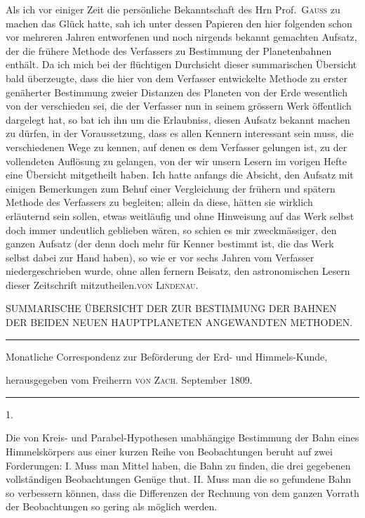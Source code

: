\expandafter\def\csname HistoricalNoteText8\endcsname{Als ich vor einiger Zeit die persönliche Bekanntschaft des Hrn Prof.\ \textsc{Gauss} zu machen das Glück hatte, sah ich unter dessen Papieren den hier folgenden schon vor mehreren Jahren entworfenen und noch nirgends bekannt gemachten Aufsatz, der die frühere Methode des Verfassers zu Bestimmung der Planetenbahnen enthält. Da ich mich bei der flüchtigen Durchsicht dieser summarischen Übersicht bald überzeugte, dass die hier von dem Verfasser entwickelte Methode zu erster genäherter Bestimmung zweier Distanzen des Planeten von der Erde wesentlich von der verschieden sei, die der Verfasser nun in seinem grössern Werk öffentlich dargelegt hat, so bat ich ihn um die Erlaubniss, diesen Aufsatz bekannt machen zu dürfen, in der Voraussetzung, dass es allen Kennern interessant sein muss, die verschiedenen Wege zu kennen, auf denen es dem Verfasser gelungen ist, zu der vollendeten Auflösung zu gelangen, von der wir unsern Lesern im vorigen Hefte eine Übersicht mitgetheilt haben. Ich hatte anfangs die Absicht, den Aufsatz mit einigen Bemerkungen zum Behuf einer Vergleichung der frühern und spätern Methode des Verfassers zu begleiten; allein da diese, hätten sie wirklich erläuternd sein sollen, etwas weitläufig und ohne Hinweisung auf das Werk selbst doch immer undeutlich geblieben wären, so schien es mir zweckmässiger, den ganzen Aufsatz (der denn doch mehr für Kenner bestimmt ist, die das Werk selbst dabei zur Hand haben), so wie er vor sechs Jahren vom Verfasser niedergeschrieben wurde, ohne allen fernern Beisatz, den astronomischen Lesern dieser Zeitschrift mitzutheilen.\hfill\textsc{von Lindenau.}}
\clearpage{}%
\begin{center}
{\small SUMMARISCHE ÜBERSICHT DER ZUR BESTIMMUNG DER BAHNEN DER BEIDEN NEUEN HAUPTPLANETEN ANGEWANDTEN METHODEN.\par}
\medskip\hrule\medskip
{\small Monatliche Correspondenz zur Beförderung der Erd- und Himmels-Kunde,\par
herausgegeben vom Freiherrn \textsc{von Zach}. September 1809.\par}
\medskip\hrule
\end{center}\medskip
\begin{center}1.\end{center}
Die von Kreis- und Parabel-Hypothesen unabhängige Bestimmung der Bahn eines Himmelskörpers aus einer kurzen Reihe von Beobachtungen beruht auf zwei Forderungen: I. Muss man Mittel haben, die Bahn zu finden, die drei gegebenen vollständigen Beobachtungen Genüge thut. II. Muss man die so gefundene Bahn so verbessern können, dass die Differenzen der Rechnung von dem ganzen Vorrath der Beobachtungen so gering als möglich werden.

